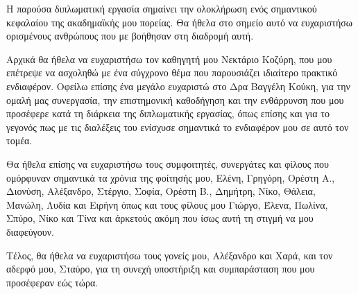 \begin{acknowledgementsgr}
  Η παρούσα διπλωματική εργασία σημαίνει την ολοκλήρωση ενός σημαντικού κεφαλαίου της ακαδημαϊκής μου πορείας. Θα ήθελα στο σημείο αυτό να ευχαριστήσω ορισμένους ανθρώπους που με βοήθησαν στη διαδρομή αυτή.

  Αρχικά θα ήθελα να ευχαριστήσω τον καθηγητή μου Νεκτάριο Κοζύρη, που μου επέτρεψε να ασχοληθώ με ένα σύγχρονο θέμα που παρουσιάζει ιδιαίτερο πρακτικό ενδιαφέρον. Οφείλω επίσης ένα μεγάλο ευχαριστώ στο Δρα Βαγγέλη Κούκη, για την ομαλή μας συνεργασία, την επιστημονική καθοδήγηση και την ενθάρρυνση που μου προσέφερε κατά τη διάρκεια της διπλωματικής εργασίας, όπως επίσης και για το γεγονός πως με τις διαλέξεις του ενίσχυσε σημαντικά το ενδιαφέρον μου σε αυτό τον τομέα.

  Θα ήθελα επίσης να ευχαριστήσω τους συμφοιτητές, συνεργάτες και φίλους που ομόρφυναν σημαντικά τα χρόνια της φοίτησής μου, Ελένη, Γρηγόρη, Ορέστη Α., Διονύση, Αλέξανδρο, Στέργιο, Σοφία, Ορέστη Β., Δημήτρη, Νίκο, Θάλεια, Μανώλη, Λυδία και Ειρήνη όπως και τους φίλους μου Γιώργο, Έλενα, Πωλίνα, Σπύρο, Νίκο και Τίνα και άρκετούς ακόμη που ίσως αυτή τη στιγμή να μου διαφεύγουν.

  Τέλος, θα ήθελα να ευχαριστήσω τους γονείς μου, Αλέξανδρο και Χαρά, και τον αδερφό μου, Σταύρο, για τη συνεχή υποστήριξη και συμπαράσταση που μου προσέφεραν εώς τώρα.
\end{acknowledgementsgr}
